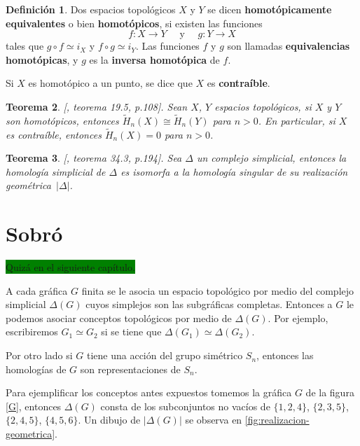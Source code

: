 \documentclass[12pt]{book}
\newtheorem{theorem}{Teorema}[section]
\theoremstyle{definition}
\newtheorem{definition}[theorem]{Definición}
\newcounter{in}
\newcounter{ini}
\begin{document}
\begin{definition}
  Dos espacios topológicos $X$ y $Y$ se dicen \textbf{homotópicamente
    equivalentes} o bien \textbf{homotópicos}, si existen las funciones
  $$f:X\rightarrow Y \quad \mbox{ y }\quad g:Y\rightarrow X$$
  tales que $g\circ f\simeq i_{X}$ y $f\circ g\simeq i_{Y}$. Las
  funciones $f$ y $g$ son llamadas\textbf{ equivalencias homotópicas},
  y $g$ es la \textbf{inversa homotópica} de $f$. 
\end{definition}
Si $X$ es homotópico a un punto, se dice que $X$ es
\textbf{contraíble}.

\begin{theorem}{[\cite{munkres1984elements}, teorema 19.5, p.108]}.
  Sean $X$, $Y$ espacios topológicos, si $X$ y $Y$ son homotópicos, entonces $\widetilde H_{n}(X)\cong \widetilde
  H_{n}(Y)$ para $n>0$. En particular, si $X$ es contraíble, entonces $\widetilde
  H_{n}(X)=0$ para $n>0$.
  \label{esp-homotopicos-homologias-iso}
\end{theorem}

\begin{theorem}{[\cite{munkres1984elements}, teorema 34.3, p.194]}.
  Sea $\Delta$ un complejo simplicial, entonces la homología
  simplicial de $\Delta$ es isomorfa a la homología singular de su
  realización geométrica~$|\Delta|$.
  \label{homologia-realizacion}
\end{theorem}
 
\chapter{Sobró}
 
{\setlength{\fboxsep}{0pt}\colorbox{green}{Quizá en el siguiente capítulo.}}

A cada gráfica $G$ finita se le asocia un espacio topológico por
medio del complejo simplicial $\Delta(G)$ cuyos simplejos son
las subgráficas completas. Entonces a $G$ le podemos asociar conceptos topológicos por
medio de $\Delta(G)$. Por ejemplo, escribiremos $G_{1}\simeq G_{2}$ si
se tiene que $\Delta(G_{1})\simeq\Delta(G_{2})$.

Por otro lado si $G$ tiene una acción del grupo simétrico
$S_{n}$, entonces las homologías de $G$ son representaciones
de $S_{n}$.

Para ejemplificar los conceptos antes expuestos tomemos la gráfica $G$ de la figura \ref{G}, entonces
$\Delta(G)$ consta de los subconjuntos no vacíos de $\{1,2,4\}$,
$\{2,3,5\}$, $\{2,4,5\}$, $\{4,5,6\}$. Un dibujo de $|\Delta(G)|$ se
observa en \ref{fig:realizacion-geometrica}.
\end{document}
